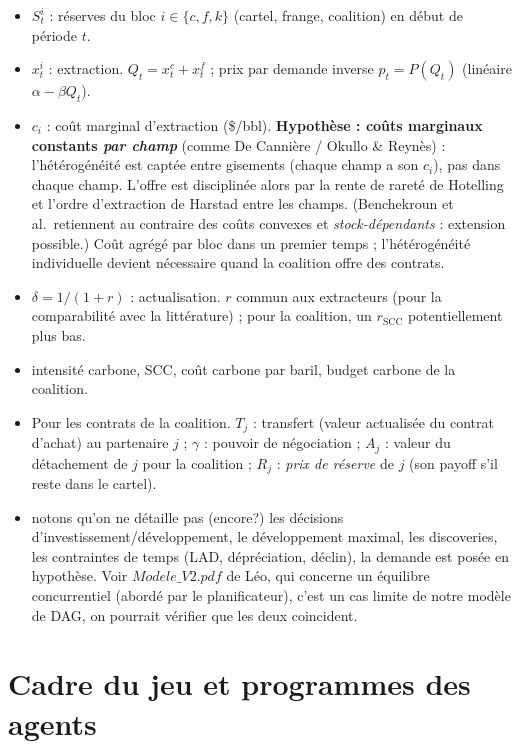 \documentclass[11pt]{article}
\begin{document}
\begin{itemize}\itemsep1pt
\item $S^i_t$ : réserves du bloc $i\in\{c,f,k\}$ (cartel, frange, coalition) en début de période $t$.
\item $x^i_t$ : extraction. $Q_t=x^c_t+x^f_t$ ; prix par demande inverse $p_t=P(Q_t)$ (linéaire $\alpha-\beta Q_t$).
\item $c_i$ : co\^ut marginal d'extraction (\$/bbl). \textbf{Hypothèse : co\^uts marginaux constants \emph{par champ}} (comme De Cannière / Okullo \& Reynès) : l'hétérogénéité est captée entre gisements (chaque champ a son $c_i$), pas dans chaque champ. L'offre est disciplinée  alors par la rente de rareté de Hotelling et l'ordre d'extraction de Harstad entre les champs. (Benchekroun et al.\ retiennent au contraire des co\^uts convexes et \emph{stock-dépendants} : extension possible.) Coût agrégé par bloc dans un premier temps ; l'hétérogénéité individuelle devient nécessaire quand la coalition offre des contrats.

\item $\delta=1/(1+r)$ : actualisation. $r$ commun aux extracteurs (pour la comparabilité avec la
littérature) ; pour la coalition, un $r_{\text{SCC}}$ potentiellement plus bas. 
\item intensité carbone, SCC, coût carbone par baril, budget carbone de la coalition. 
\item Pour les contrats de la coalition. $T_j$ : transfert (valeur actualisée du contrat d'achat) au partenaire $j$ ; $\gamma$ : pouvoir de négociation ; $A_j$ : valeur du détachement de $j$ pour la coalition ; $R_j$ : \emph{prix de réserve} de $j$ (son payoff s'il reste dans le cartel).

\item notons qu'on ne détaille pas (encore?) les décisions d'investissement/développement, le développement maximal, les discoveries, les contraintes de temps (LAD, dépréciation, déclin), la demande est posée en hypothèse. Voir $Modele\_V2.pdf$ de Léo, qui concerne un équilibre concurrentiel (abordé par le planificateur), c'est un cas limite de notre modèle de DAG, on pourrait vérifier que les deux coincident.   
\end{itemize}


\section{Cadre du jeu et programmes des agents}
\end{document}
